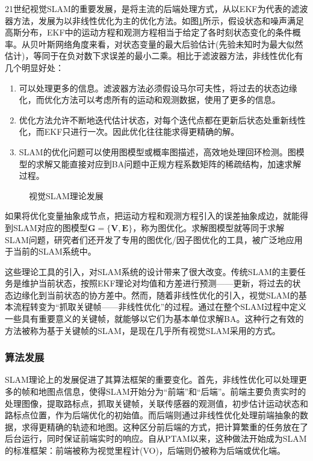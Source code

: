 21世纪视觉SLAM的重要发展，是将主流的后端处理方式，从以EKF为代表的滤波器方法，发展为以非线性优化为主的优化方法。如图\ref{fig1.1}所示，假设状态和噪声满足高斯分布，EKF中的运动方程和观测方程相当于给定了各时刻状态变化的条件概率。从贝叶斯网络角度来看，对状态变量的最大后验估计(先验未知时为最大似然估计)，等同于在负对数下求误差的最小二乘\upcite{[1.36]}。相比于滤波器方法，非线性优化有几个明显好处：
\begin{enumerate}[label={(\arabic*)}]
\item 可以处理更多的信息。滤波器方法必须假设马尔可夫性，将过去的状态边缘化，而优化方法可以考虑所有的运动和观测数据，使用了更多的信息。
\item 优化方法允许不断地迭代估计状态，对每个迭代点都在更新后状态处重新线性化，而EKF只进行一次。因此优化往往能求得更精确的解。
\item SLAM的优化问题可以使用图模型或概率图描述，高效地处理回环检测。图模型的求解又能直接对应到BA问题中正规方程系数矩阵的稀疏结构，加速求解过程。
\end{enumerate}

\begin{figure}[H]
    \centering
     \caption{视觉SLAM理论发展}
\label{fig1.1}
\end{figure}

如果将优化变量抽象成节点，把运动方程和观测方程引入的误差抽象成边，就能得到SLAM对应的图模型$\boldsymbol{G}=\lbrace \boldsymbol{V}, \boldsymbol{E} \rbrace$，称为图优化\upcite{[1.37]}。求解图模型就等同于求解SLAM问题，研究者们还开发了专用的图优化/因子图优化的工具\upcite{[1.37],[1.38]}，被广泛地应用于当前的SLAM系统中。


这些理论工具的引入，对SLAM系统的设计带来了很大改变。传统SLAM的主要任务是维护当前状态，按照EKF理论对均值和方差进行预测——更新，将过去的状态边缘化到当前状态的协方差中。然而，随着非线性优化的引入，视觉SLAM的基本流程转变为“抓取关键帧——非线性优化”的过程。通过在整个SLAM过程中定义一些具有重要意义的关键帧，就能够以它们为基本单位求解BA。这种行之有效的方法被称为基于关键帧的SLAM，是现在几乎所有视觉SLAM采用的方式。



\subsubsection{算法发展}
SLAM理论上的发展促进了其算法框架的重要变化。首先，非线性优化可以处理更多的帧和地图点信息，使得SLAM开始分为“前端”和“后端”。前端主要负责实时的处理图像，提取路标点，抓取关键帧，关联传感器的观测值，初步估计运动状态和路标点位置，作为后端优化的初始值。而后端则通过非线性优化处理前端抽象的数据，求得更精确的轨迹和地图。这种区分前后端的方式，把计算繁重的任务放在了后台运行，同时保证前端实时的响应。自从PTAM以来，这种做法开始成为SLAM的标准框架：前端被称为视觉里程计(VO)\upcite{[1.39]}，后端则仍被称为后端或优化端。

